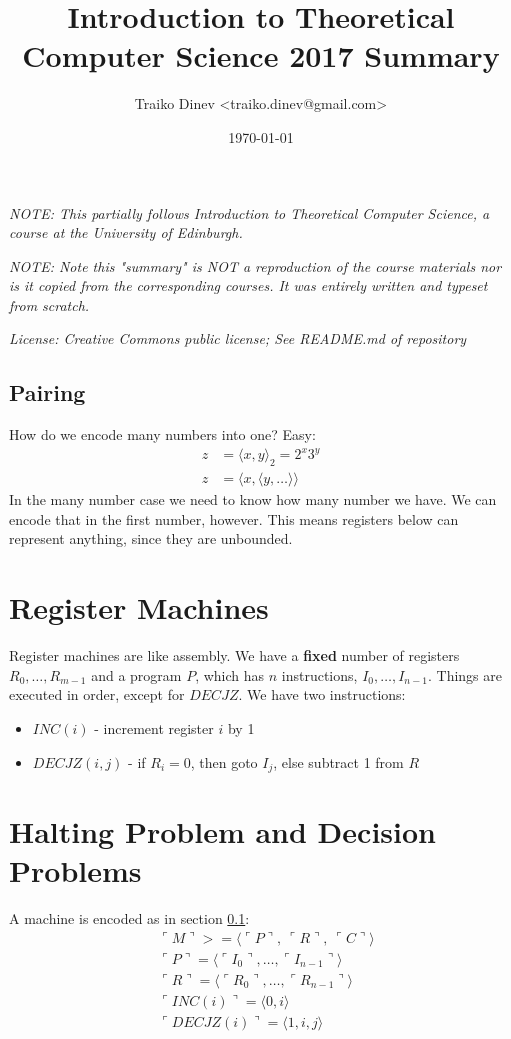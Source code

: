 \documentclass{article}
\title{Introduction to Theoretical Computer Science 2017 Summary}
\date{\today}
\author{Traiko Dinev \textless traiko.dinev@gmail.com\textgreater}
\begin{document}
\maketitle

\textit{NOTE: This partially follows Introduction to Theoretical Computer Science, a course at the University of Edinburgh.}

\textit{NOTE: Note this "summary" is NOT a reproduction of the course materials nor is it copied from the corresponding courses. It was entirely written and typeset from scratch.}

\textit{License: Creative Commons public license; See README.md of repository}

\subsection{Pairing}

\label{sec:pairing}
How do we encode many numbers into one? Easy:
\begin{align*}
    z &= \langle x, y \rangle_2 = 2^x 3^y \\
    z &= \langle x, \langle y, \dots \rangle \rangle
\end{align*}
In the many number case we need to know how many number we have. We can encode that in the first number, however. This means registers below can represent anything, since they are unbounded.

\section{Register Machines}
Register machines are like assembly. We have a \textbf{fixed} number of registers $R_0, \dots, R_{m-1}$ and a program $P$, which has $n$ instructions, $I_0, \dots, I_{n-1}$. Things are executed in order, except for $DECJZ$.
We have two instructions:

\begin{itemize}
    \item $INC(i)$ - increment register $i$ by 1
    \item $DECJZ(i, j)$ - if $R_i = 0$, then goto $I_j$, else subtract 1 from $R$
\end{itemize}

\section{Halting Problem and Decision Problems}
A machine is encoded as in section \ref{sec:pairing}:
\begin{align*}
    & \ulcorner M\urcorner >= \langle \ulcorner P\urcorner,\ \ulcorner R\urcorner,\      \ulcorner C\urcorner \rangle \\
    & \ulcorner P\urcorner = \langle \ulcorner I_0\urcorner, \dots, \ulcorner I_{n-1}\urcorner \rangle \\
    & \ulcorner R\urcorner = \langle \ulcorner R_0\urcorner, \dots, \ulcorner R_{n-1}\urcorner \rangle \\
    & \ulcorner INC(i)\urcorner = \langle 0, i \rangle \\
    & \ulcorner DECJZ(i)\urcorner = \langle 1, i, j \rangle \\
\end{align*}
\end{document}
